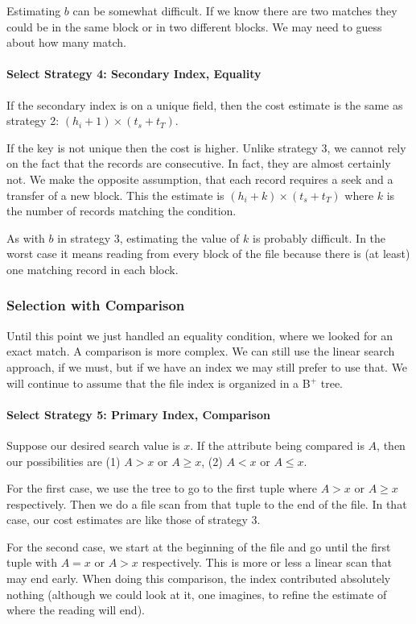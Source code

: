 \documentclass[a4paper]{report}
\begin{document}
Estimating $b$ can be somewhat difficult. If we know there are two matches they could be in the same block or in two different blocks. We may need to guess about how many match.

\paragraph{Select Strategy 4: Secondary Index, Equality}
If the secondary index is on a unique field, then the cost estimate is the same as strategy 2:  $(h_{i} + 1) \times (t_{s} + t_{T})$.

If the key is not unique then the cost is higher. Unlike strategy 3, we cannot rely on the fact that the records are consecutive. In fact, they are almost certainly not. We make the opposite assumption, that each record requires a seek and a transfer of a new block. This the estimate is $(h_{i} + k) \times (t_{s} + t_{T})$ where $k$ is the number of records matching the condition.

As with $b$ in strategy 3, estimating the value of $k$ is probably difficult. In the worst case it means reading from every block of the file because there is (at least) one matching record in each block.

\subsubsection*{Selection with Comparison}

Until this point we just handled an equality condition, where we looked for an exact match. A comparison is more complex. We can still use the linear search approach, if we must, but if we have an index we may still prefer to use that. We will continue to assume that the file index is organized in a B$^{+}$ tree.

\paragraph{Select Strategy 5: Primary Index, Comparison}
Suppose our desired search value is $x$. If the attribute being compared is $A$, then our possibilities are (1) $A > x$ or $A \geq x$, (2) $A < x$ or $A \leq x$.

For the first case, we use the tree to go to the first tuple where $A > x$ or $A \geq x$ respectively. Then we do a file scan from that tuple to the end of the file. In that case, our cost estimates are like those of strategy 3.

For the second case, we start at the beginning of the file and go until the first tuple with $A = x$ or $A > x$ respectively. This is more or less a linear scan that may end early. When doing this comparison, the index contributed absolutely nothing (although we could look at it, one imagines, to refine the estimate of where the reading will end).
\end{document}
